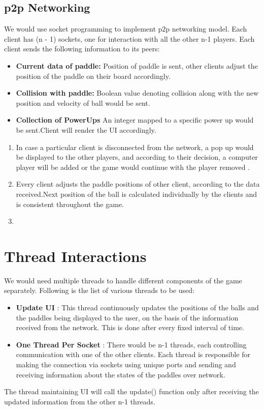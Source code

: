 \documentclass{article}
\begin{document}
			\subsection{p2p Networking}
			\par\noindent We would use socket programming to implement p2p networking model. Each client has (n - 1) sockets, one for interaction with all the other n-1 players. Each client sends the following information to its peers:
			\begin{itemize}
			\item \textbf{Current data of paddle:} Position of paddle is sent,  other clients adjust the position of the paddle on their board accordingly. 
			\item \textbf{Collision with paddle:} Boolean value denoting collision along with the new position and velocity of ball would be sent.
			\item \textbf{Collection of PowerUps} An integer mapped to a specific power up would be sent.Client will render the UI accordingly.
			\end{itemize}
				\begin{enumerate}
					\item In case a particular client is disconnected from the network, a pop up would be displayed to the other players, and according to their decision, a computer player will be added or the game would continue with the player removed .
					\item Every client adjusts the paddle positions of other client, according to the data received.Next position of the ball is calculated individually by the clients and is consistent throughout the game.
					\item  
				\end{enumerate}
			

	\section{Thread Interactions}
	\par\noindent We would need multiple threads to handle different components of the game separately. Following is the list of various threads to be used:
	\begin{itemize}
	\item \textbf{Update UI} : This thread continuously updates the positions of the balls and the paddles being displayed to the user, on the basis of the information received from the network. This is done after every fixed interval of time.
	\item \textbf{One Thread Per Socket} : There would be n-1 threads, each controlling communication with one of the other clients. Each thread is responsible for making the connection via sockets using unique ports and sending and receiving information about the states of the paddles over network.
	\end{itemize}
	\par\noindent The thread maintaining UI will call the update() function only after receiving the updated information from the other n-1 threads.
\end{document}
